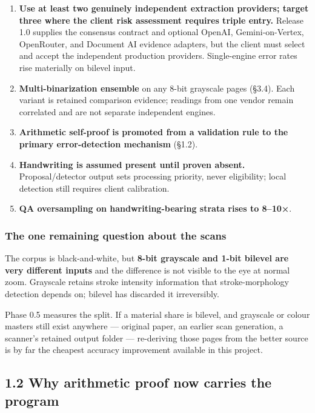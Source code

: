 \documentclass[
]{article}
\providecommand{\tightlist}{%
  \setlength{\itemsep}{0pt}\setlength{\parskip}{0pt}}
\begin{document}
\begin{enumerate}
\def\labelenumi{\arabic{enumi}.}
\tightlist
\item
  \textbf{Use at least two genuinely independent extraction providers;
  target three where the client risk assessment requires triple entry.}
  Release 1.0 supplies the consensus contract and optional OpenAI,
  Gemini-on-Vertex, OpenRouter, and Document AI evidence adapters, but
  the client must select and accept the independent production
  providers. Single-engine error rates rise materially on bilevel input.
\item
  \textbf{Multi-binarization ensemble} on any 8-bit grayscale pages
  (§3.4). Each variant is retained comparison evidence; readings from
  one vendor remain correlated and are not separate independent engines.
\item
  \textbf{Arithmetic self-proof is promoted from a validation rule to
  the primary error-detection mechanism} (§1.2).
\item
  \textbf{Handwriting is assumed present until proven absent.}
  Proposal/detector output sets processing priority, never eligibility;
  local detection still requires client calibration.
\item
  \textbf{QA oversampling on handwriting-bearing strata rises to
  8--10×}.
\end{enumerate}

\subsubsection{The one remaining question about the
scans}\label{the-one-remaining-question-about-the-scans}

The corpus is black-and-white, but \textbf{8-bit grayscale and 1-bit
bilevel are very different inputs} and the difference is not visible to
the eye at normal zoom. Grayscale retains stroke intensity information
that stroke-morphology detection depends on; bilevel has discarded it
irreversibly.

Phase 0.5 measures the split. If a material share is bilevel, and
grayscale or colour masters still exist anywhere --- original paper, an
earlier scan generation, a scanner's retained output folder ---
re-deriving those pages from the better source is by far the cheapest
accuracy improvement available in this project.

\subsection{1.2 Why arithmetic proof now carries the
program}\label{why-arithmetic-proof-now-carries-the-program}
\end{document}
